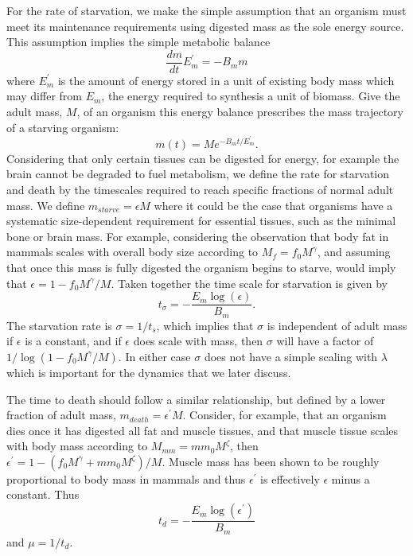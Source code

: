 \documentclass[12pt,english]{article}
\begin{document}
\begin{spacing}{1.9}
For the rate of starvation, we make the simple assumption that an organism must meet its maintenance requirements using digested mass as the sole energy source. This assumption implies the simple metabolic balance 
\begin{equation}
\frac{dm}{dt}E_{m}^{\prime}=-B_{m}m
\end{equation}
where $E_{m}^{\prime}$ is the amount of energy stored in a unit of existing body mass which may differ from  $E_{m}$, the energy required to synthesis a unit of biomass. Give the adult mass,  $M$, of an organism this energy balance prescribes the mass trajectory of a starving organism:
\begin{equation}
m\left(t\right)=Me^{-B_{m}t/E_{m}^{\prime}}.
\end{equation}
Considering that only certain tissues can be digested for energy, for example the brain cannot be degraded to fuel metabolism, we define the rate for starvation and death by the timescales required to reach specific fractions of normal adult mass. We define $m_{starve}=\epsilon M$ where it could be the case that organisms have a systematic size-dependent requirement for essential tissues, such as the minimal bone or brain mass. For example, considering the observation that body fat in mammals scales with overall body size according to $M_{f}=f_{0}M^{\gamma}$, and assuming that once this mass is fully digested the organism begins to starve, would imply that $\epsilon=1-f_{0}M^{\gamma}/M$. Taken together the time scale for starvation is given by
\begin{equation}
t_{\sigma}=-\frac{E_{m}\log\left(\epsilon\right)}{B_{m}}.
\end{equation}
The starvation rate is $\sigma=1/t_{s}$, which implies that $\sigma$ is independent of adult mass if $\epsilon$ is a constant, and if $\epsilon$ does scale with mass, then $\sigma$ will have a factor of $1/\log\left(1-f_{0}M^{\gamma}/M\right)$. In either case $\sigma$ does not have a simple scaling with $\lambda$ which is important for the dynamics that we later discuss. 

The time to death should follow a similar relationship, but defined by a lower fraction of adult mass, $m_{death}=\epsilon^{\prime} M$. Consider, for example, that an organism dies once it has digested all fat and muscle tissues, and that muscle tissue scales with body mass according to $M_{mm}=mm_{0}M^{\zeta}$, then $\epsilon^{\prime}=1-\left(f_{0}M^{\gamma}+mm_{0}M^{\zeta}\right)/M$. Muscle mass has been shown to be roughly proportional to body mass \cite{} in mammals and thus  $\epsilon^{\prime}$ is effectively $\epsilon$ minus a constant. Thus
\begin{equation}
t_{d}=-\frac{E_{m}\log\left(\epsilon^{\prime}\right)}{B_{m}}
\end{equation}
and $\mu=1/t_{d}$. 


\end{spacing}
\end{document}
